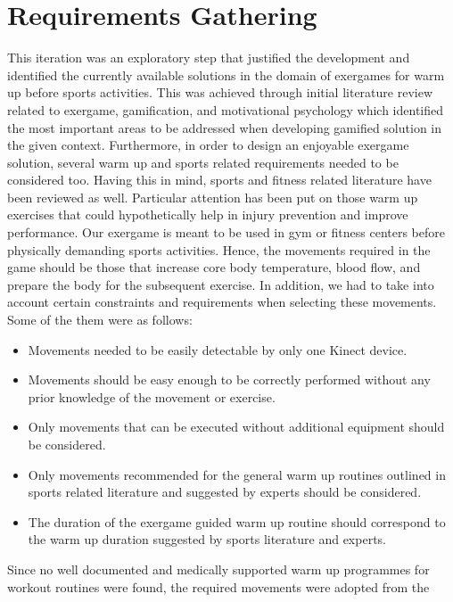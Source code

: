 \section{Requirements Gathering}
This iteration was an exploratory step that justified the development and identified the currently available solutions in the domain of exergames for warm up before sports activities. This was achieved through initial literature review related to exergame, gamification, and motivational psychology which identified the most important areas to be addressed when developing gamified solution in the given context. Furthermore, in order to design an enjoyable exergame solution, several warm up and sports related requirements needed to be considered too. Having this in mind, sports and fitness related literature have been reviewed as well. Particular attention has been put on those warm up exercises that could hypothetically help in injury prevention and improve performance. Our exergame is meant to be used in gym or fitness centers before physically demanding sports activities. Hence, the movements required in the game should be those that increase core body temperature, blood flow, and prepare the body for the subsequent exercise. In addition, we had to take into account certain constraints and requirements when selecting these movements. Some of the them were as follows:
\begin{itemize}
\item Movements needed to be easily detectable by only one Kinect device.
\item Movements should be easy enough to be correctly performed without any prior knowledge of the movement or exercise.
\item Only movements that can be executed without additional equipment should be considered.   
\item Only movements recommended for the general warm up routines outlined in sports related literature and suggested by experts should be considered.
\item The duration of the exergame guided warm up routine should correspond to the warm up duration suggested by sports literature and experts.
\end{itemize}
Since no well documented and medically supported warm up programmes for workout routines were found,  the required movements were adopted from the 
